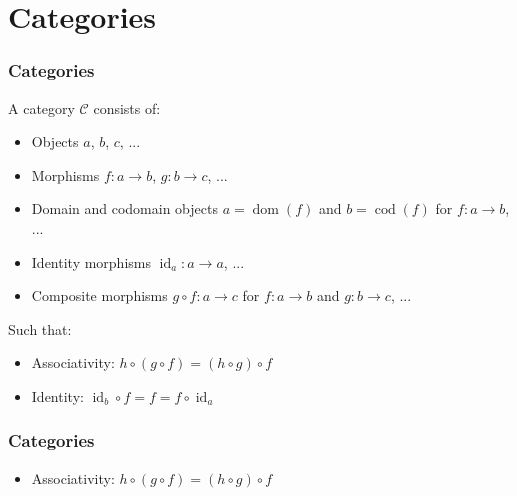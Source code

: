 \documentclass{beamer}
\DeclareMathOperator{\dom}{dom}
\DeclareMathOperator{\cod}{cod}
\DeclareMathOperator{\id}{id}
\newcommand{\idO}[1]{\natO{\id}{#1}}
\newcommand{\comp}{\ensuremath{\mathrel{\circ}}}
\newcommand{\cat}[1]{\ensuremath{\mathcal{#1}}}
\newcommand{\nat}[1]{\ensuremath{#1}}
\newcommand{\natO}[2]{\ensuremath{\nat{#1}_{#2}}}
\begin{document}
\section{Categories}


\begin{frame}[label={def:category}]
  \frametitle{Categories}

  \begin{definition}[Category]
    A category \cat{C} consists of:
    \begin{itemize}
    \item
      Objects $a$, $b$, $c$, ...
    \item
      Morphisms $f: a \to b$, $g: b \to c$, ...
    \item
      Domain and codomain objects $a = \dom(f)$ and $b = \cod(f)$ for
      $f: a \to b$, ...
    \item
      Identity morphisms $\idO{a}: a \to a$, ...
    \item
      Composite morphisms $g \comp f: a \to c$ for $f: a \to b$ and
      $g: b \to c$, ...
    \end{itemize}
    Such that:
    \begin{itemize}
    \item
      Associativity: $h \comp (g \comp f) = (h \comp g) \comp f$
    \item
      Identity: $\idO{b} \comp f = f = f \comp \idO{a}$
    \end{itemize}
  \end{definition}

\end{frame}


\begin{frame}
  \frametitle{Categories}

  \begin{definition}[Category]
    \begin{itemize}
    \item
      Associativity: $h \comp (g \comp f) = (h \comp g) \comp f$
    \end{itemize}
  \end{definition}
  \begin{center}
  \end{center}

\end{frame}
\end{document}
